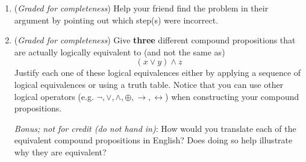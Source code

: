 \documentclass[12pt, oneside]{article}
\newcommand{\gradeComplete}{({\it Graded for completeness}) }
\begin{document}
\begin{enumerate}[labelindent=0pt, leftmargin=0pt]
\begin{enumerate}
        \item\gradeComplete 
        Help your friend find the problem in their argument by pointing out which step(s) were incorrect.
        
        \item\gradeComplete Give {\bf three} different compound propositions
        that are actually logically equivalent to (and not the same as)
        \[
            (x \lor y) \land z
        \]
        Justify each one of these logical equivalences either by applying a sequence of logical equivalences
        or using a truth table.  Notice that you can use other logical operators (e.g. $\lnot, \lor, \land, \oplus, \to, 
        \leftrightarrow$) 
        when constructing your compound propositions.
     
        {\it Bonus; not for credit (do not hand in)}: How would you translate each of the equivalent compound
        propositions in English? Does doing so help illustrate why they are equivalent?
        \end{enumerate}
        
     
\end{enumerate}
\end{document}
